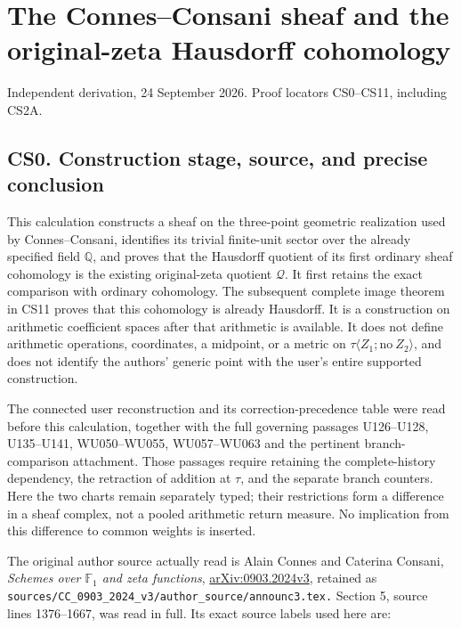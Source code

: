 \section{The Connes--Consani sheaf and the original-zeta Hausdorff
cohomology}\label{the-connesconsani-sheaf-and-the-original-zeta-hausdorff-cohomology}

Independent derivation, 24 September 2026. Proof locators CS0--CS11,
including CS2A.

\subsection{CS0. Construction stage, source, and precise
conclusion}\label{cs0.-construction-stage-source-and-precise-conclusion}

This calculation constructs a sheaf on the three-point geometric
realization used by Connes--Consani, identifies its trivial finite-unit
sector over the already specified field \(\mathbb Q\), and proves that
the Hausdorff quotient of its first ordinary sheaf cohomology is the
existing original-zeta quotient \(\mathcal Q\). It first retains the
exact comparison with ordinary cohomology. The subsequent complete image
theorem in CS11 proves that this cohomology is already Hausdorff. It is
a construction on arithmetic coefficient spaces after that arithmetic is
available. It does not define arithmetic operations, coordinates, a
midpoint, or a metric on \(\tau\langle Z_1;\mathrm{no}\ Z_2\rangle\),
and does not identify the authors' generic point with the user's entire
supported construction.

The connected user reconstruction and its correction-precedence table
were read before this calculation, together with the full governing
passages U126--U128, U135--U141, WU050--WU055, WU057--WU063 and the
pertinent branch-comparison attachment. Those passages require retaining
the complete-history dependency, the retraction of addition at \(\tau\),
and the separate branch counters. Here the two charts remain separately
typed; their restrictions form a difference in a sheaf complex, not a
pooled arithmetic return measure. No implication from this difference to
common weights is inserted.

The original author source actually read is Alain Connes and Caterina
Consani, \emph{Schemes over \(\mathbb F_1\) and zeta functions},
\href{https://arxiv.org/abs/0903.2024v3}{arXiv:0903.2024v3}, retained as
\nolinkurl{sources/CC_0903_2024_v3/author_source/announc3.tex.} Section
5, source lines 1376--1667, was read in full. Its exact source labels
used here are:

